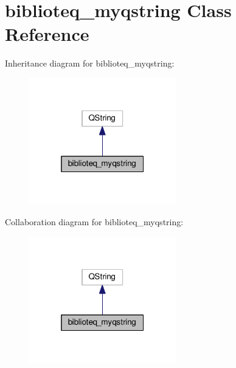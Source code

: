 \hypertarget{classbiblioteq__myqstring}{}\section{biblioteq\+\_\+myqstring Class Reference}
\label{classbiblioteq__myqstring}


Inheritance diagram for biblioteq\+\_\+myqstring\+:
\nopagebreak
\begin{figure}[H]
\begin{center}
\leavevmode
\includegraphics[width=181pt]{classbiblioteq__myqstring__inherit__graph}
\end{center}
\end{figure}


Collaboration diagram for biblioteq\+\_\+myqstring\+:
\nopagebreak
\begin{figure}[H]
\begin{center}
\leavevmode
\includegraphics[width=181pt]{classbiblioteq__myqstring__coll__graph}
\end{center}
\end{figure}
